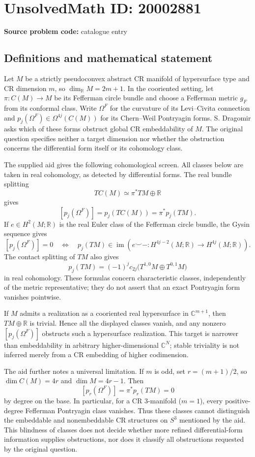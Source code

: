 \documentclass[11pt]{article}
\newcommand{\R}{\mathbb{R}}
\newcommand{\C}{\mathbb{C}}
\begin{document}
\section*{UnsolvedMath ID: 20002881}
\textbf{Source problem code:} catalogue entry
\subsection{Definitions and mathematical statement}
Let $M$ be a strictly pseudoconvex abstract CR manifold of hypersurface type and CR dimension $m$, so $\dim_\R M=2m+1$. In the cooriented setting, let $\pi:C(M)\to M$ be its Fefferman circle bundle and choose a Fefferman metric $g_F$ from its conformal class. Write $\Omega^F$ for the curvature of its Levi--Civita connection and $p_j(\Omega^F)\in\Omega^{4j}(C(M))$ for its Chern--Weil Pontryagin forms. S. Dragomir asks which of these forms obstruct global CR embeddability of $M$. The original question specifies neither a target dimension nor whether the obstruction concerns the differential form itself or its cohomology class.

The supplied aid gives the following cohomological screen. All classes below are taken in real cohomology, as detected by differential forms. The real bundle splitting
\[
TC(M)\simeq\pi^*TM\oplus\R
\]
gives
\[
[p_j(\Omega^F)]=p_j(TC(M))=\pi^*p_j(TM).
\]
If $e\in H^2(M;\R)$ is the real Euler class of the Fefferman circle bundle, the Gysin sequence gives
\[
[p_j(\Omega^F)]=0
\quad\Longleftrightarrow\quad
p_j(TM)\in\operatorname{im}\left(e\smile-:H^{4j-2}(M;\R)\longrightarrow H^{4j}(M;\R)\right).
\]
The contact splitting of $TM$ also gives
\[
p_j(TM)=(-1)^j c_{2j}\bigl(T^{1,0}M\oplus T^{0,1}M\bigr)
\]
in real cohomology. These formulas concern characteristic classes, independently of the metric representative; they do not assert that an exact Pontryagin form vanishes pointwise.

If $M$ admits a realization as a cooriented real hypersurface in $\C^{m+1}$, then $TM\oplus\R$ is trivial. Hence all the displayed classes vanish, and any nonzero $[p_j(\Omega^F)]$ obstructs such a hypersurface realization. This target is narrower than embeddability in arbitrary higher-dimensional $\C^N$; stable triviality is not inferred merely from a CR embedding of higher codimension.

The aid further notes a universal limitation. If $m$ is odd, set $r=(m+1)/2$, so $\dim C(M)=4r$ and $\dim M=4r-1$. Then
\[
[p_r(\Omega^F)]=\pi^*p_r(TM)=0
\]
by degree on the base. In particular, for a CR $3$-manifold ($m=1$), every positive-degree Fefferman Pontryagin class vanishes. Thus these classes cannot distinguish the embeddable and nonembeddable CR structures on $S^3$ mentioned by the aid. This blindness of classes does not decide whether more refined differential-form information supplies obstructions, nor does it classify all obstructions requested by the original question.
\end{document}

